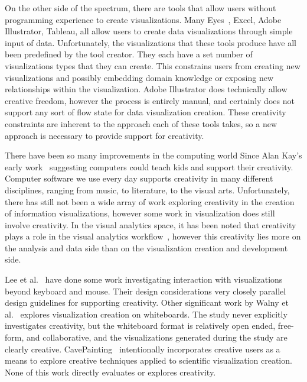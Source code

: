 On the other side of the spectrum, there are tools that allow users without programming experience to create visualizations.
Many Eyes~\cite{viegas2007manyeyes}, Excel, Adobe Illustrator, Tableau, all allow users to create data visualizations through simple input of data.
Unfortunately, the visualizations that these tools produce have all been predefined by the tool creator.
They each have a set number of visualizations types that they can create.
This constrains users from creating new visualizations and possibly embedding domain knowledge or exposing new relationships within the visualization.
Adobe Illustrator does technically allow creative freedom, however the process is entirely manual, and certainly does not support any sort of flow state for data visualization creation.
These creativity constraints are inherent to the approach each of these tools takes, so a new approach is necessary to provide support for creativity.

\label{creativitySupport}

There have been so many improvements in the computing world Since Alan Kay's early work~\cite{Kay1972, Goldberg1977} suggesting computers could teach kids and support their creativity.
Computer software we use every day supports creativity in many different disciplines, ranging from music, to literature, to the visual arts.
Unfortunately, there has still not been a wide array of work exploring creativity in the creation of information visualizations, however some work in visualization does still involve creativity.
In the visual analytics space, it has been noted that creativity plays a role in the visual analytics workflow~\cite{scholtz2006beyond}, however this creativity lies more on the analysis and data side than on the visualization creation and development side.

Lee et al.~\cite{lee2012beyond} have done some work investigating interaction with visualizations beyond keyboard and mouse.
Their design considerations very closely parallel design guidelines for supporting creativity.
Other significant work by Walny et al.~\cite{walny2011visual} explores visualization creation on whiteboards.
The study never explicitly investigates creativity, but the whiteboard format is relatively open ended, free-form, and collaborative, and the visualizations generated during the study are clearly creative.
CavePainting~\cite{Keefe-2008-SSF} intentionally incorporates creative users as a means to explore creative techniques applied to scientific visualization creation.
None of this work directly evaluates or explores creativity.


